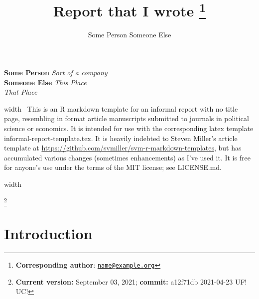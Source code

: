 \documentclass[
  11pt,
  american,
  letterpaper,
  ]{article}
\title{ Report that I
wrote%
    \thanks{\textbf{Corresponding author}:
\href{mailto:name@example.org}{\nolinkurl{name@example.org}}} 
   }
\author{
      {Some Person}%
%    
      {}%
%    
      {Someone Else}%
%    
      {}}
\date{}
\renewenvironment{abstract}
 {{%
    \setlength{\leftmargin}{0mm}%
    \setlength{\rightmargin}{\leftmargin}%
  }%
  \relax}%
 {\endlist}
\newcommand\blfootnote[1]{%
  \begingroup
  \renewcommand\thefootnote{}\footnote{#1}%
  \addtocounter{footnote}{-1}%
  \endgroup
}
\begin{document}


    {%
    \setlength{\parindent}{0pt}
    \thispagestyle{plain}
    {\fontsize{18}{20}\selectfont\raggedright 
      \maketitle 
    }%
    {
      \vskip 13.5pt\relax \normalsize\fontsize{11}{13} 
      
          \textbf{\authorfont Some Person}%
          \textbf{\authorfont }%
          \tabto{4.5cm}\emph{Sort of a company}\\%
          \textbf{\authorfont Someone Else}%
          \textbf{\authorfont }%
          \tabto{4.5cm}\emph{This Place}\\\tabto{4.5cm}\emph{That
Place}\\%
        \vskip -12.75pt %
    }%
  }%
  
      \begin{abstract}
    \hbox{\vrule height .2pt width \textwidth}%
          \vskip 2pt
        \noindent This is an R markdown template for an informal report
with no title page, resembling in format article manuscripts submitted
to journals in political science or economics. It is intended for use
with the corresponding latex template informal-report-template.tex. It
is heavily indebted to Steven Miller's article template at
\url{https://github.com/svmiller/svm-r-markdown-templates}, but has
accumulated various changes (sometimes enhancements) as I've used it. It
is free for anyone's use under the terms of the MIT license; see
LICENSE.md.
          \par
      \hbox{\vrule height .2pt width \textwidth}
        \end{abstract}
    \vskip -26.5pt

\noindent 
  

\blfootnote{\textbf{Current version:} September 03, 2021; \textbf{commit:} a12f71db 2021-04-23 UF! UC!}

\hypertarget{introduction}{%
\section{Introduction}\label{introduction}}
\end{document}
